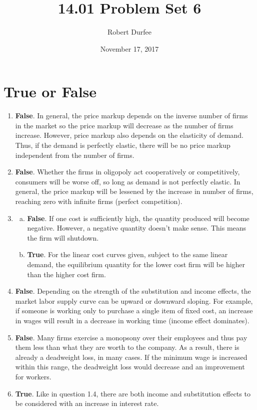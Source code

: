 \documentclass{article}
\title{ 14.01 Problem Set 6 }
\author{ Robert Durfee }
\date{ November 17, 2017 }
\begin{document}
\maketitle

\section{ True or False }

\begin{enumerate}
    \item \textbf{False}. In general, the price markup depends on the inverse
        number of firms in the market so the price markup will decrease as the
        number of firms increase. However, price markup also depends on the
        elasticity of demand. Thus, if the demand is perfectly elastic, there
        will be no price markup independent from the number of firms.
    \item \textbf{False}. Whether the firms in oligopoly act cooperatively or
        competitively, consumers will be worse off, so long as demand is not
        perfectly elastic. In general, the price markup will be lessened by the
        increase in number of firms, reaching zero with infinite firms (perfect
        competition).     
    \item 
        \begin{enumerate}[a.]
            \item \textbf{False}. If one cost is sufficiently high, the quantity
                produced will become negative. However, a negative quantity
                doesn't make sense. This means the firm will shutdown.
            \item \textbf{True}. For the linear cost curves given, subject to
                the same linear demand, the equilibrium quantity for the lower
                cost firm will be higher than the higher cost firm.
        \end{enumerate}
    \item \textbf{False}. Depending on the strength of the substitution and
        income effects, the market labor supply curve can be upward or downward
        sloping. For example, if someone is working only to purchase a single
        item of fixed cost, an increase in wages will result in a decrease in
        working time (income effect dominates).
    \item \textbf{False}. Many firms exercise a monopsony over their employees
        and thus pay them less than what they are worth to the company. As a
        result, there is already a deadweight loss, in many cases. If the
        minimum wage is increased within this range, the deadweight loss would
        decrease and an improvement for workers.
    \item \textbf{True}. Like in question 1.4, there are both income and
        substitution effects to be considered with an increase in interest
        rate. 
\end{enumerate}
\end{document}
